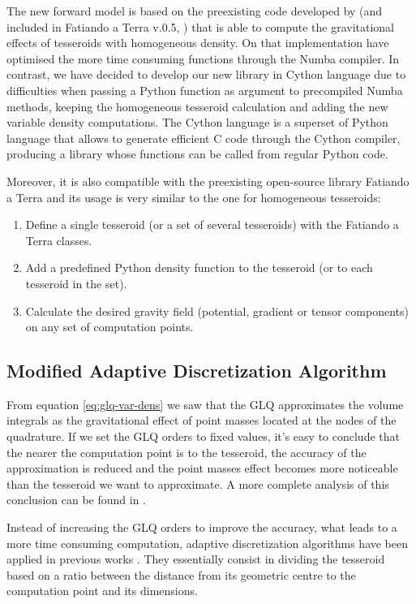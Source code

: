 \documentclass[extra]{gji}
\begin{document}
The new forward model is based on the preexisting code developed by \citet{Uieda2016} (and included in Fatiando a Terra v.0.5, \citet{Uieda2013}) that is able to compute the gravitational effects of tesseroids with homogeneous density.
On that implementation \citet{Uieda2016} have optimised the more time consuming functions through the Numba compiler.
In contrast, we have decided to develop our new library in Cython language due to difficulties when passing a Python function as argument to precompiled Numba methods, keeping the homogeneous tesseroid calculation and adding the new variable density computations.
The Cython language is a superset of Python language that allows to generate efficient C code through the Cython compiler, producing a library whose functions can be called from regular Python code.

Moreover, it is also compatible with the preexisting open-source library Fatiando a Terra and its usage is very similar to the one for homogeneous tesseroids:

\begin{enumerate}
\renewcommand{\theenumi}{(\arabic{enumi})}
    \item Define a single tesseroid (or a set of several tesseroids) with the Fatiando a Terra classes.
    \item Add a predefined Python density function to the tesseroid (or to each tesseroid in the set).
    \item Calculate the desired gravity field (potential, gradient or tensor components) on any set of computation points.
\end{enumerate}


\subsection{Modified Adaptive Discretization Algorithm}

From equation \ref{eq:glq-var-dens} we saw that the GLQ approximates the volume integrals as the gravitational effect of point masses located at the nodes of the quadrature.
If we set the GLQ orders to fixed values, it's easy to conclude that the nearer the computation point is to the tesseroid, the accuracy of the approximation is reduced and the point masses effect becomes more noticeable than the tesseroid we want to approximate.
A more complete analysis of this conclusion can be found in \citet{Ku1977, Li2011, Uieda2016}.

Instead of increasing the GLQ orders to improve the accuracy, what leads to a more time consuming computation, adaptive discretization algorithms have been applied in previous works \citep{Li2011, Uieda2016}.
They essentially consist in dividing the tesseroid based on a ratio between the distance from its geometric centre to the computation point and its dimensions.
\end{document}
